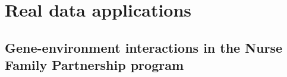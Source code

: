 \documentclass[useAMS,usenatbib,referee]{biom}
\newcommand{\sail}{\texttt{sail}}
\begin{document}


%
%
%





\section{Real data applications} \label{sec:sail_rda}

\subsection{Gene-environment interactions in the Nurse Family Partnership program}




\end{document}
